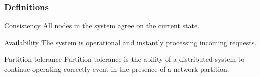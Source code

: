 \documentclass[10pt]{beamer}
\begin{document}
\begin{frame}
  \frametitle{Definitions}
  \begin{alertblock}{Consistency \cite{pedersenConsistencyDistributedPervasive2022}}
    All nodes in the system agree on the current state.
  \end{alertblock}
  \begin{alertblock}{Availability \cite{pedersenConsistencyDistributedPervasive2022}}
    The system is operational and instantly processing incoming requests.
  \end{alertblock}
  \begin{alertblock}{Partition tolerance \cite{pedersenConsistencyDistributedPervasive2022}}
    Partition tolerance is the ability of a distributed system to continue operating correctly event in the presence of a network partition.
  \end{alertblock}
\end{frame}
\end{document}
